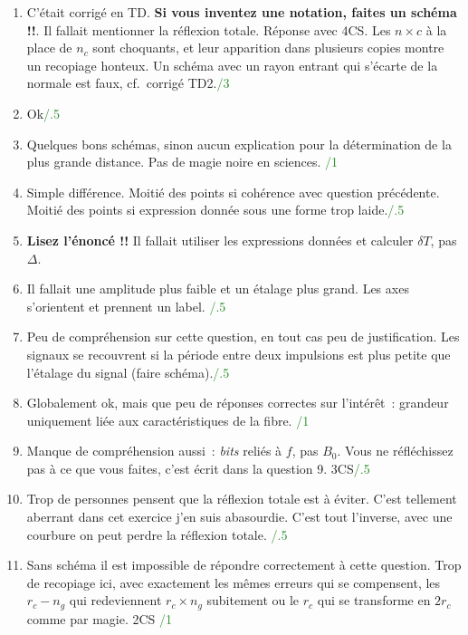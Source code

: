 \documentclass[a4paper, 10pt, final, garamond]{book}
\begin{document}
\begin{enumerate}[start=3]
    \item{C'était corrigé en TD. \textbf{Si vous inventez une notation, faites
            un schéma !!}. Il fallait mentionner la réflexion totale. Réponse
            avec 4CS. Les $n\times c$ à la place de $n_c$ sont choquants, et
            leur apparition dans plusieurs copies montre un recopiage
        honteux. Un schéma avec un rayon entrant qui s'écarte de la normale est
    faux, cf.\ corrigé TD2.\hfill \textcolor{ForestGreen}{/3}}

    \item{Ok\hfill \textcolor{ForestGreen}{/.5}}
    \item{Quelques bons schémas, sinon aucun explication pour la détermination
            de la plus grande distance. Pas de magie noire en sciences.\hfill
        \textcolor{ForestGreen}{/1}}
    \item{Simple différence. Moitié des points si cohérence avec question
            précédente. Moitié des points si expression donnée sous une forme
        trop laide.\hfill \textcolor{ForestGreen}{/.5}}
    \item{\textbf{Lisez l'énoncé !!} Il fallait utiliser les expressions données
        et calculer $\delta T$, pas $\Delta$.}
    \item{Il fallait une amplitude plus faible et un étalage plus grand. Les
            axes s'orientent et prennent un label.\hfill
        \textcolor{ForestGreen}{/.5}}
    \item{Peu de compréhension sur cette question, en tout cas peu de
            justification. Les signaux se recouvrent si la période entre deux
            impulsions est plus petite que l'étalage du signal (faire
        schéma).\hfill \textcolor{ForestGreen}{/.5}}
    \item{Globalement ok, mais que peu de réponses correctes sur l'intérêt~:
        grandeur uniquement liée aux caractéristiques de la fibre.\hfill
    \textcolor{ForestGreen}{/1}}
    \item Manque de compréhension aussi~: \textit{bits} reliés à $f$, pas $B_0$.
        Vous ne réfléchissez pas à ce que vous faites, c'est écrit dans la
        question 9. 3CS\hfill \textcolor{ForestGreen}{/.5}
    \item Trop de personnes pensent que la réflexion totale est à éviter. C'est
        tellement aberrant dans cet exercice j'en suis abasourdie. C'est tout
        l'inverse, avec une courbure on peut perdre la réflexion totale.\hfill
        \textcolor{ForestGreen}{/.5}
    \item Sans schéma il est impossible de répondre correctement à cette
        question. Trop de recopiage ici, avec exactement les mêmes erreurs qui
        se compensent, les $r_c-n_g$ qui redeviennent $r_c\times n_g$ subitement
        ou le $r_c$ qui se transforme en $2r_c$ comme par magie. 2CS\hfill
        \textcolor{ForestGreen}{/1}
\end{enumerate}
\end{document}
